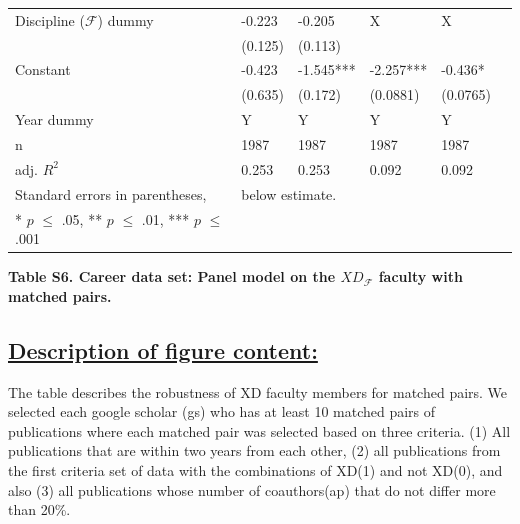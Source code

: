 \documentclass{article}\usepackage[]{graphicx}\usepackage[]{color}
\begin{document}
\begin{table}[h!]
\begin{center}
{\begin{tabular}{l l l l l l }
    
    \hline
    
    \rowcolor{gray!33} 
    Discipline ($\mathscr{F}$) dummy 
    
    &  -0.223             &  -0.205         & X           & X                     \\
    {} 
    &  (0.125)           & (0.113)          &             &                     \\
    
    \rowcolor{gray!33} 
    Constant 
    & -0.423  &    -1.545***     & -2.257***   & -0.436*    \\
    {} 
    & (0.635)  &  (0.172)    & (0.0881)     & (0.0765)              \\
    
    \rowcolor{gray!33} 
    Year dummy 
    & Y &   Y     & Y   & Y    \\
    
    \hline
    
     \rowcolor{gray!33} 
     n 
     & 1987 &   1987     & 1987   & 1987    \\
     
     \rowcolor{gray!33}
     adj. ${R^2}$ 
     & 0.253 & 0.253 & 0.092 & 0.092  \\
    
    \hline
    \hline
    
    Standard errors in parentheses, & \multicolumn{5}{l}{ below  estimate.} \\
    {* $\textit{p}$ $\leq$ .05, ** $\textit{p}$ $\leq$ .01, *** $\textit{p}$ $\leq$ .001}
    
  \end{tabular}%
  }
  \end{center}
\end{table}

\begin{center}
\par{\textbf{Table S6. Career data set: Panel model on the $XD_{\mathscr{F}}$ faculty with matched pairs. }}\\
\end{center}

\newpage
\subsection*{\underline{Description of figure content:}}
\par{The table describes the robustness of XD faculty members for matched pairs. We selected each google scholar (gs) who has at least 10 matched pairs of publications where each matched pair was selected based on three criteria. (1) All publications that are within two years from each other, (2) all publications from the first criteria set of data with the combinations of XD(1) and not XD(0), and also (3) all publications whose number of coauthors(ap) that do not differ more than 20\%.
}
\end{document}
